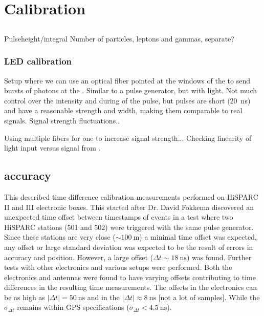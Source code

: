 \chapter{Calibration}
\label{ch:calibration}

\section{\pmt}
\label{sec:pmt}

Pulseheight/integral
Number of particles, leptons and gammas, separate?


\subsection{LED calibration}
\label{sub:led_calibration}

Setup where we can use an optical fiber pointed at the windows of the
\pmt to send bursts of photons at the \pmt. Similar to a pulse
generator, but with light. Not much control over the intensity and
during of the pulse, but pulses are short (\SI{20}{\nano\second}) and
have a reasonable strength and width, making them comparable to real
signals. Signal strength fluctuations..

Using multiple fibers for one \pmt to increase signal strength...
Checking linearity of light input versus signal from \pmt.


\section{\gps accuracy}
\label{sec:gps_accuracy}

This described time difference calibration measurements performed on
HiSPARC II and III electronic boxes. This started after Dr. David
Fokkema discovered an unexpected time offset between timestamps of
events in a test where two HiSPARC stations (501 and 502) were triggered
with the same pulse generator. Since these stations are very close
($\sim\SI{100}{\meter}$) a minimal time offset was expected, any offset
or large standard deviation was expected to be the result of errors in
\gps accuracy and position. However, a large offset ($\Delta t
\sim\SI{18}{\nano\second}$) was found. Further tests with other \hisparc
electronics and various setups were performed. Both the \hisparc
electronics and \gps antennas were found to have varying offsets
contributing to time differences in the resulting time measurements. The
offsets in the \hisparc electronics can be as high as $|\Delta t| =
\SI{50}{\nano\second}$ and in the \gps $|\Delta t| \approx
\SI{8}{\nano\second}$ [not a lot of samples]. While the $\sigma_{\Delta
t}$ remains within GPS specifications ($\sigma_{\Delta t} <
\SI{4.5}{\nano\second}$).


